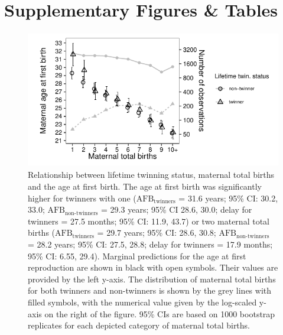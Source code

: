 \documentclass[a4paper]{article}\usepackage[]{graphicx}\usepackage[]{color}
\begin{document}


\pagebreak


\section{Supplementary Figures \& Tables}

\begin{figure}[H]
\begin{center}
\includegraphics[height = 6cm]{../figures/figS1.pdf}
\end{center}
\caption{Relationship between lifetime twinning status, maternal total births and the age at first birth. The age at first birth was significantly higher for twinners with one ($\textrm{AFB}_\textrm{twinners}$ = 31.6 years; 95\% CI: 30.2, 33.0; $\textrm{AFB}_\textrm{non-twinners}$ = 29.3 years; 95\% CI 28.6, 30.0; delay for twinners = 27.5 months; 95\% CI: 11.9, 43.7) or two maternal total births ($\textrm{AFB}_\textrm{twinners}$ = 29.7 years; 95\% CI: 28.6, 30.8; $\textrm{AFB}_\textrm{non-twinners}$ = 28.2 years; 95\% CI: 27.5, 28.8; delay for twinners = 17.9 months; 95\% CI: 6.55, 29.4). Marginal predictions for the age at first reproduction are shown in black with open symbols. Their values are provided by the left y-axis. The distribution of maternal total births for both twinners and non-twinners is shown by the grey lines with filled symbols, with the numerical value given by the log-scaled y-axis on the right of the figure. 95\% CIs are based on 1000 bootstrap replicates for each depicted category of maternal total births.}
\end{figure}
\end{document}
